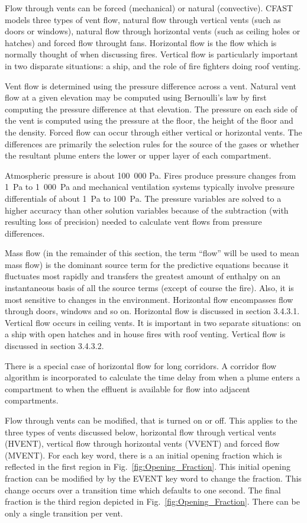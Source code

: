 Flow through vents can be forced (mechanical) or natural (convective). CFAST models three types of vent flow, natural flow through vertical vents (such as doors or windows),  natural flow through horizontal vents (such as ceiling holes or hatches) and forced flow throught fans.  Horizontal flow is the flow which is normally thought of when discussing fires.  Vertical flow is particularly important in two disparate situations: a ship, and the role of fire fighters doing roof venting.

Vent flow is determined using the pressure difference across a vent.  Natural vent flow at a given elevation may be computed using Bernoulli's law by first computing the pressure difference at that elevation.  The pressure on each side of the vent is computed using the pressure at the floor, the height of the floor and the density.  Forced flow can occur through either vertical or horizontal vents. The differences are primarily the selection rules for the source of the gases or whether the resultant plume enters the lower or upper layer of each compartment.

Atmospheric pressure is about 100~000 Pa. Fires produce pressure changes from 1~Pa to 1~000~Pa and mechanical ventilation systems typically involve pressure differentials of about 1~Pa to 100~Pa.  The pressure variables are solved to a higher accuracy than other solution variables because of the subtraction (with resulting loss of precision) needed to calculate vent flows from pressure differences.

Mass flow (in the remainder of this section, the term ``flow'' will be used to mean mass flow) is the dominant source term for the predictive equations because it fluctuates most rapidly and transfers the greatest amount of enthalpy on an instantaneous basis of all the source terms (except of course the fire).  Also, it is most sensitive to changes in the environment.  Horizontal flow encompasses flow through doors, windows and so on. Horizontal flow is discussed in section 3.4.3.1. Vertical flow occurs in ceiling vents.  It is important in two separate situations: on a ship with open hatches and in house fires with roof venting.  Vertical flow is discussed in section 3.4.3.2.

There is a special case of horizontal flow for long corridors. A corridor flow algorithm is incorporated to calculate the time delay from when a plume enters a compartment to when the effluent is available for flow into adjacent compartments.

Flow through vents can be modified, that is turned on or off. This applies to the three types of vents discussed below, horizontal flow through vertical vents (HVENT), vertical flow through horizontal vents (VVENT) and forced flow (MVENT). For each key word, there is a an initial opening fraction which is reflected in the first region in Fig.~\ref{fig:Opening_Fraction}. This initial opening fraction can be modified by by the EVENT key word to change the fraction. This change occurs over a transition time which defaults to one second. The final fraction is the third region depicted in Fig.~\ref{fig:Opening_Fraction}. There can be only a single transition per vent.

